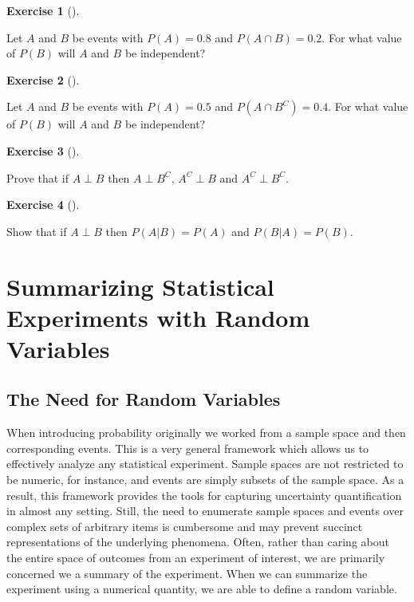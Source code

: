 \documentclass[
  letterpaper,
  DIV=11,
  numbers=noendperiod]{scrreprt}
\theoremstyle{definition}
\newtheorem{exercise}{Exercise}[chapter]
\theoremstyle{definition}
\theoremstyle{definition}
\theoremstyle{remark}
\begin{document}
\begin{exercise}[]\protect\hypertarget{exr-4.13}{}\label{exr-4.13}

Let \(A\) and \(B\) be events with \(P(A) = 0.8\) and
\(P(A \cap B) = 0.2\). For what value of \(P(B)\) will \(A\) and \(B\)
be independent?

\end{exercise}

\begin{exercise}[]\protect\hypertarget{exr-4.14}{}\label{exr-4.14}

Let \(A\) and \(B\) be events with \(P(A) = 0.5\) and
\(P(A \cap B^C) = 0.4\). For what value of \(P(B)\) will \(A\) and \(B\)
be independent?

\end{exercise}

\begin{exercise}[]\protect\hypertarget{exr-4.15}{}\label{exr-4.15}

Prove that if \(A\perp B\) then \(A\perp B^C\), \(A^C \perp B\) and
\(A^C \perp B^C\).

\end{exercise}

\begin{exercise}[]\protect\hypertarget{exr-4.16}{}\label{exr-4.16}

Show that if \(A\perp B\) then \(P(A|B) = P(A)\) and \(P(B|A) = P(B)\).

\end{exercise}

\chapter{Summarizing Statistical Experiments with Random
Variables}\label{summarizing-statistical-experiments-with-random-variables}

\section{The Need for Random
Variables}\label{the-need-for-random-variables}

When introducing probability originally we worked from a sample space
and then corresponding events. This is a very general framework which
allows us to effectively analyze any statistical experiment. Sample
spaces are not restricted to be numeric, for instance, and events are
simply subsets of the sample space. As a result, this framework provides
the tools for capturing uncertainty quantification in almost any
setting. Still, the need to enumerate sample spaces and events over
complex sets of arbitrary items is cumbersome and may prevent succinct
representations of the underlying phenomena. Often, rather than caring
about the entire space of outcomes from an experiment of interest, we
are primarily concerned we a summary of the experiment. When we can
summarize the experiment using a numerical quantity, we are able to
define a random variable.
\end{document}

